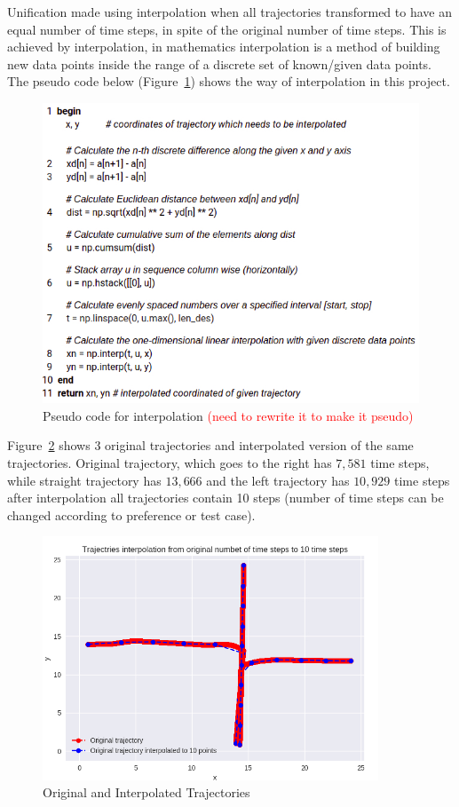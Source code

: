 Unification made using interpolation when all trajectories transformed to have an equal number of time steps, in spite of the original number of time steps. This is achieved by interpolation, in mathematics interpolation is a method of building new data points inside the range of a discrete set of known/given data points. \\

The pseudo code below (Figure~\ref{fig:pseudoInter}) shows the way of interpolation in this project.

\begin{figure}[h]
	\centering  	
	\includegraphics[width=13cm]{img/interpolation.jpg}
	\caption{Pseudo code for interpolation \textcolor{red}{(need to rewrite it to make it pseudo)}}
	\label{fig:pseudoInter}    
\end{figure}

Figure~\ref{fig:InterExam} shows 3 original trajectories and interpolated version of the same trajectories. Original trajectory, which goes to the right has $7,581$ time steps, while straight trajectory has $13,666$ and the left trajectory has $10,929$ time steps after interpolation all trajectories contain 10 steps (number of time steps can be changed according to preference or test case).

\begin{figure}[h]
	\centering  	
	\includegraphics[width=10cm]{img/interpolation_example.jpg}
	\caption{Original and Interpolated Trajectories}
	\label{fig:InterExam}    
\end{figure}

